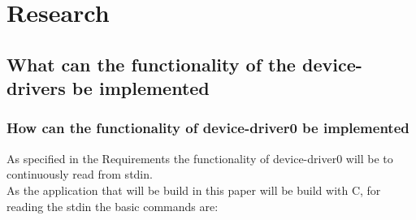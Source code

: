 \hypertarget{research}{%
\chapter{Research}\label{research}}

\hypertarget{what-can-the-functionality-of-the-device-drivers-be-implemented}{%
\section{What can the functionality of the device-drivers be
implemented}\label{what-can-the-functionality-of-the-device-drivers-be-implemented}}

\hypertarget{how-can-the-functionality-of-device-driver0-be-implemented}{%
\subsection{How can the functionality of device-driver0 be
implemented}\label{how-can-the-functionality-of-device-driver0-be-implemented}}

As specified in the Requirements the functionality of device-driver0
will be to continuously read from stdin.\\
As the application that will be build in this paper will be build with
C, for reading the stdin the basic commands are:

